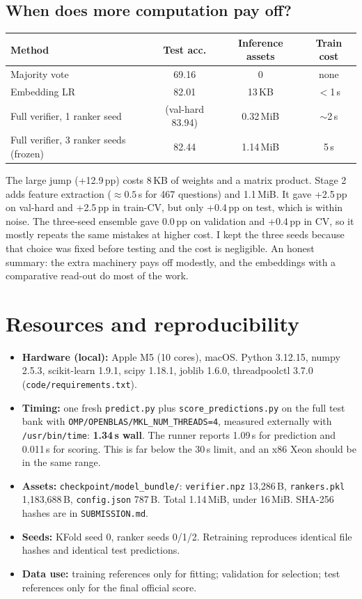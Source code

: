 \documentclass[10pt,a4paper]{article}
\begin{document}
\subsection{When does more computation pay off?}\label{sec:cost}
\begin{table}[h]\centering\small
\begin{tabular}{lccc}\toprule
Method & Test acc. & Inference assets & Train cost \\ \midrule
Majority vote & 69.16 & 0 & none \\
Embedding LR & 82.01 & 13\,KB & $<$1\,s \\
Full verifier, 1 ranker seed & (val-hard 83.94) & 0.32\,MiB & ${\sim}$2\,s \\
Full verifier, 3 ranker seeds (frozen) & 82.44 & 1.14\,MiB & 5\,s \\ \bottomrule
\end{tabular}
\end{table}
The large jump (+12.9\,pp) costs 8\,KB of weights and a matrix product. Stage 2 adds feature extraction (${\approx}0.5$\,s for 467 questions) and 1.1\,MiB. It gave +2.5\,pp on val-hard and +2.5\,pp in train-CV, but only +0.4\,pp on test, which is within noise. The three-seed ensemble gave 0.0\,pp on validation and +0.4\,pp in CV, so it mostly repeats the same mistakes at higher cost. I kept the three seeds because that choice was fixed before testing and the cost is negligible. An honest summary: the extra machinery pays off modestly, and the embeddings with a comparative read-out do most of the work.

\section{Resources and reproducibility}
\begin{itemize}
\item \textbf{Hardware (local):} Apple M5 (10 cores), macOS. Python 3.12.15, numpy 2.5.3, scikit-learn 1.9.1, scipy 1.18.1, joblib 1.6.0, threadpoolctl 3.7.0 (\texttt{code/requirements.txt}).
\item \textbf{Timing:} one fresh \texttt{predict.py} plus \texttt{score\_predictions.py} on the full test bank with \texttt{OMP/OPENBLAS/MKL\_NUM\_THREADS=4}, measured externally with \texttt{/usr/bin/time}: \textbf{1.34\,s wall}. The runner reports 1.09\,s for prediction and 0.011\,s for scoring. This is far below the 30\,s limit, and an x86 Xeon should be in the same range.
\item \textbf{Assets:} \texttt{checkpoint/model\_bundle/}: \texttt{verifier.npz} 13{,}286\,B, \texttt{rankers.pkl} 1{,}183{,}688\,B, \texttt{config.json} 787\,B. Total 1.14\,MiB, under 16\,MiB. SHA-256 hashes are in \texttt{SUBMISSION.md}.
\item \textbf{Seeds:} KFold seed 0, ranker seeds 0/1/2. Retraining reproduces identical file hashes and identical test predictions.
\item \textbf{Data use:} training references only for fitting; validation for selection; test references only for the final official score.
\end{itemize}
\end{document}
